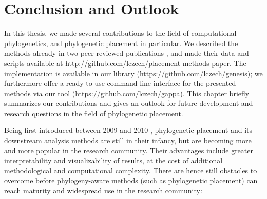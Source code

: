 
\chapter{Conclusion and Outlook}
\label{ch:ConclusionOutlook}

In this thesis, we made several contributions to the field of computational phylogenetics,
and phylogenetic placement in particular.
We described the methods already in two peer-reviewed publications \cite{Czech2018,Czech2018a},
and made their data and scripts available at \url{http://github.com/lczech/placement-methods-paper}.
The implementation is available in our  library (\url{https://github.com/lczech/genesis});
we furthermore offer a ready-to-use command line interface for the presented methods
via our  tool (\url{https://github.com/lczech/gappa}).
This chapter briefly summarizes our contributions and gives an outlook for future development and research questions
in the field of phylogenetic placement.

Being first introduced between 2009 and 2010 \cite{Berger2009,Matsen2010a},
phylogenetic placement and its downstream analysis methods are still in their infancy,
but are becoming more and more popular in the research community.
Their advantages include greater interpretability and visualizability of results,
at the cost of additional methodological and computational complexity.
There are hence still obstacles to overcome before phylogeny-aware methods (such as phylogenetic placement)
can reach maturity and widespread use in the research community:

